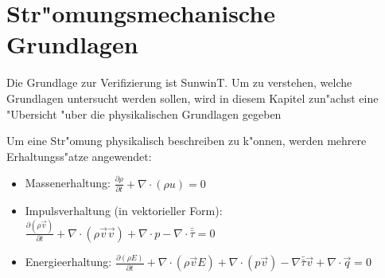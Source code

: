 \newpage
\chapter{Str"omungsmechanische Grundlagen}
Die Grundlage zur Verifizierung ist SunwinT. Um zu verstehen, welche Grundlagen untersucht werden sollen, wird in diesem Kapitel zun"achst eine "Ubersicht "uber die physikalischen Grundlagen gegeben

Um eine Str"omung physikalisch beschreiben zu k"onnen, werden mehrere Erhaltungss"atze angewendet:
\begin{itemize}
	\item Massenerhaltung: $\frac{\partial \rho}{\partial t} + \nabla \cdot (\rho u) = 0$
	\item Impulsverhaltung (in vektorieller Form): $\frac{\partial (\rho \vec{v})}{\partial t} + \nabla \cdot (\rho \vec v \vec v ) + \nabla \cdot p - \nabla \cdot \bar{\bar{\tau}} = 0$
	\item Energieerhaltung: $\frac{\partial (\rho E)}{\partial t} + \nabla \cdot (\rho \vec{v} E) + \nabla \cdot (p \vec{v}) - \nabla \bar{\bar{\tau}} \vec{v} + \nabla \cdot \vec{q} = 0$ 
\end{itemize}

